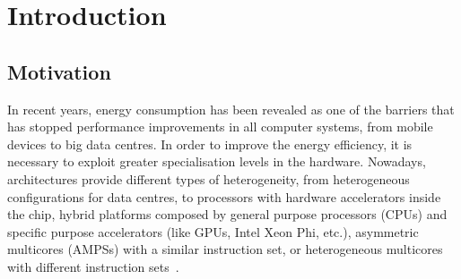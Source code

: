 \cleardoublepage

\chapter*{Introduction}
\label{ch:chapter1}

\section*{Motivation}


In recent years, energy consumption has been revealed as one of the
barriers that has stopped performance improvements in all computer
systems, from mobile devices to big data centres. In order to improve the
energy efficiency, it is necessary to exploit greater specialisation levels
in the hardware. Nowadays, architectures provide different types of
heterogeneity, from heterogeneous configurations for data centres, to
processors with hardware accelerators inside the chip, hybrid platforms
composed by general purpose processors (CPUs) and specific purpose
accelerators (like GPUs, Intel Xeon Phi, etc.), asymmetric multicores
(AMPSs) with a similar instruction set, or heterogeneous multicores with
different instruction sets~\cite{NRC2011,KoSh13}.



